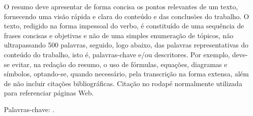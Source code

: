 
O resumo deve apresentar de forma concisa os pontos relevantes de um texto, fornecendo uma visão rápida e clara do conteúdo e das conclusões do trabalho. O texto, redigido na forma impessoal do verbo, é constituído de uma sequência de frases concisas e objetivas e não de uma simples enumeração de tópicos, não ultrapassando 500 palavras, seguido, logo abaixo, das palavras representativas do conteúdo do trabalho, isto é, palavras-chave e/ou descritores. Por exemplo, deve-se evitar, na redação do resumo, o uso de fórmulas, equações, diagramas e símbolos, optando-se, quando necessário, pela transcrição na forma extensa, além de não incluir citações bibliográficas.  Citação no rodapé normalmente utilizada para referenciar páginas Web.


Palavras-chave: \imprimirpalavraschave .